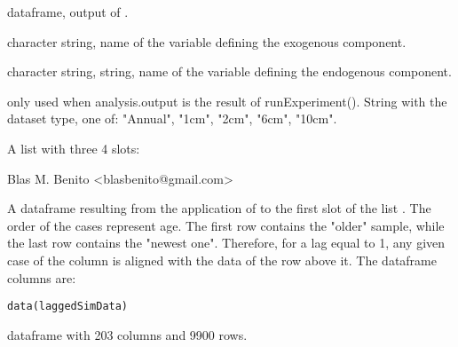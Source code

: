 \documentclass[letterpaper]{book}
\begin{document}
%
\begin{Arguments}
\begin{ldescription}
\item[\code{analysis.output}] dataframe, output of .

\item[\code{exogenous.component}] character string, name of the variable defining the exogenous component.

\item[\code{endogenous.component}] character string, string, name of the variable defining the endogenous component.

\item[\code{sampling.subset}] only used when analysis.output is the result of runExperiment(). String with the dataset type, one of: "Annual", "1cm", "2cm", "6cm", "10cm".
\end{ldescription}
\end{Arguments}
%
\begin{Value}
A list with three 4 slots:
\end{Value}
%
\begin{Author}\relax
Blas M. Benito  <blasbenito@gmail.com>
\end{Author}
%
\begin{SeeAlso}\relax
{}
\end{SeeAlso}
%
\begin{Description}\relax
A dataframe resulting from the application of  to the first slot of the list . The order of the cases represent age. The first row contains the "older" sample, while the last row contains the "newest one". Therefore, for a lag equal to 1, any given case of the column  is aligned with the data of the row above it. The dataframe columns are:
\end{Description}
%
\begin{Usage}
\begin{verbatim}
data(laggedSimData)
\end{verbatim}
\end{Usage}
%
\begin{Format}
dataframe with 203 columns and 9900 rows.
\end{Format}
\end{document}
